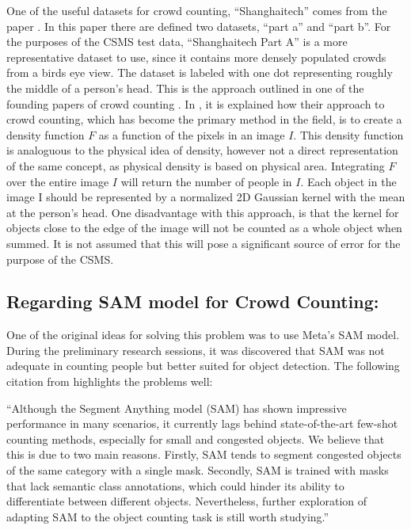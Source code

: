 \documentclass[
]{article}
\begin{document}
One of the useful datasets for crowd counting, ``Shanghaitech'' comes
from the paper \textcite{Zhang_2016_CVPR}. In this paper there are
defined two datasets, ``part a'' and ``part b''. For the purposes of the
CSMS test data, ``Shanghaitech Part A'' is a more representative dataset
to use, since it contains more densely populated crowds from a birds eye
view. The dataset is labeled with one dot representing roughly the
middle of a person's head. This is the approach outlined in one of the
founding papers of crowd counting \textcite{NIPS2010_fe73f687}. In
\textcite{NIPS2010_fe73f687}, it is explained how their approach to
crowd counting, which has become the primary method in the field, is to
create a density function \(F\) as a function of the pixels in an image
\(I\). This density function is analoguous to the physical idea of
density, however not a direct representation of the same concept, as
physical density is based on physical area. Integrating \(F\) over the
entire image \(I\) will return the number of people in \(I\).
\autocite{NIPS2010_fe73f687} Each object in the image I should be
represented by a normalized 2D Gaussian kernel with the mean at the
person's head. One disadvantage with this approach, is that the kernel
for objects close to the edge of the image will not be counted as a
whole object when summed. It is not assumed that this will pose a
significant source of error for the purpose of the CSMS.

\hypertarget{regarding-sam-model-for-crowd-counting}{%
\subsection{Regarding SAM model for Crowd
Counting:}\label{regarding-sam-model-for-crowd-counting}}

One of the original ideas for solving this problem was to use Meta's SAM
model. During the preliminary research sessions, it was discovered that
SAM was not adequate in counting people but better suited for object
detection. The following citation from \textcite{ma2023sam} highlights
the problems well:

``Although the Segment Anything model (SAM) has shown impressive
performance in many scenarios, it currently lags behind state-of-the-art
few-shot counting methods, especially for small and congested objects.
We believe that this is due to two main reasons. Firstly, SAM tends to
segment congested objects of the same category with a single mask.
Secondly, SAM is trained with masks that lack semantic class
annotations, which could hinder its ability to differentiate between
different objects. Nevertheless, further exploration of adapting SAM to
the object counting task is still worth studying.'' \autocite{ma2023sam}
\end{document}
